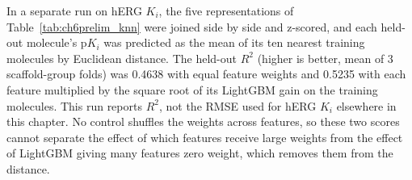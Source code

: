 In a separate run on hERG $K_i$, the five representations of Table~\ref{tab:ch6prelim_knn} were joined side by side and z-scored, and each held-out molecule's p$K_i$ was predicted as the mean of its ten nearest training molecules by Euclidean distance. The held-out $R^2$ (higher is better, mean of 3 scaffold-group folds) was 0.4638 with equal feature weights and 0.5235 with each feature multiplied by the square root of its LightGBM gain on the training molecules. This run reports $R^2$, not the RMSE used for hERG $K_i$ elsewhere in this chapter. No control shuffles the weights across features, so these two scores cannot separate the effect of which features receive large weights from the effect of LightGBM giving many features zero weight, which removes them from the distance.



